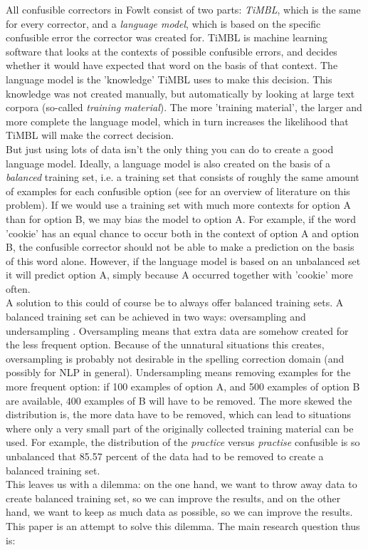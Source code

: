 \documentclass[12pt]{article}
\begin{document}
All confusible correctors in Fowlt consist of two parts: \emph{TiMBL}, which is the same for every corrector, and a \emph{language model}, which is based on the specific confusible error the corrector was created for. TiMBL is machine learning software that looks at the contexts of possible confusible errors, and decides whether it would have expected that word on the basis of that context. The language model is the 'knowledge' TiMBL uses to make this decision. This knowledge was not created manually, but automatically by looking at large text corpora (so-called \emph{training material}). The more 'training material', the larger and more complete the language model, which in turn increases the likelihood that TiMBL will make the correct decision. \\\indent
But just using lots of data isn't the only thing you can do to create a good language model. Ideally, a language model is also created on the basis of a \emph{balanced} training set, i.e. a training set that consists of roughly the same amount of examples for each confusible option (see \citealt{hg09} for an overview of literature on this problem). If we would use a training set with much more contexts for option A than for option B, we may bias the model to option A. For example, if the word 'cookie' has an equal chance to occur both in the context of option A and option B, the confusible corrector should not be able to make a prediction on the basis of this word alone. However, if the language model is based on an unbalanced set it will predict option A, simply because A occurred together with 'cookie' more often. \\\indent
A solution to this could of course be to always offer balanced training sets. A balanced training set can be achieved in two ways: oversampling and undersampling \citep{provost, gh09, vhkn07, hg09}. Oversampling means that extra data are somehow created for the less frequent option. Because of the unnatural situations this creates, oversampling is probably not desirable in the spelling correction domain (and possibly for NLP in general). Undersampling means removing examples for the more frequent option: if 100 examples of option A, and 500 examples of option B are available, 400 examples of B will have to be removed. The more skewed the distribution is, the more data have to be removed, which can lead to situations where only a very small part of the originally collected training material can be used. For example, the distribution of the \emph{practice} versus \emph{practise} confusible is so unbalanced that 85.57 percent of the data had to be removed to create a balanced training set. \\\indent
This leaves us with a dilemma: on the one hand, we want to throw away data to create balanced training set, so we can improve the results, and on the other hand, we want to keep as much data as possible, so we can improve the results. This paper is an attempt to solve this dilemma. The main research question thus is:
\end{document}
